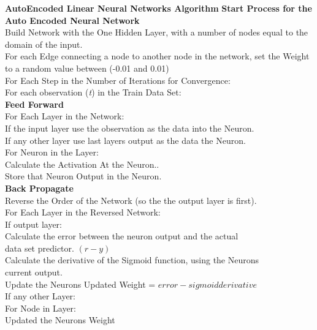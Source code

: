 \documentclass[twoside,11pt]{article}
\newcommand\tab[1][1cm]{\hspace*{#1}}
\begin{document}
\textbf{AutoEncoded Linear Neural Networks Algorithm}\newline
\textbf{Start Process for the Auto Encoded Neural Network}\\
Build Network with the One Hidden Layer, with a number of nodes equal to the domain of the input.\\
For each Edge connecting a node to another node in the network, set the Weight to a random value between (-0.01 and 0.01) \\
For Each Step in the Number of Iterations for Convergence:\\
\tab For each observation (\textit{t}) in the Train Data Set:\\
\tab \tab \textbf{Feed Forward}\\
\tab \tab \tab For Each Layer in the Network:\\
\tab \tab \tab \tab If the input layer use the observation as the data into the Neuron.\\
\tab \tab \tab \tab If any other layer use last layers output as the data the Neuron.\\
\tab \tab \tab \tab  For Neuron in the Layer:\\
\tab \tab \tab \tab \tab Calculate the Activation At the Neuron..\\
\tab \tab \tab \tab \tab Store that Neuron Output in the Neuron.\\
\tab \tab \textbf{Back Propagate} \\
\tab \tab \tab Reverse the Order of the Network (so the the output layer is first).\\
\tab \tab \tab For Each Layer in the Reversed Network:\\
\tab \tab \tab \tab If output layer:\\
\tab \tab \tab \tab \tab Calculate the error between the neuron output and the actual\\ 
\tab \tab \tab \tab \tab data set predictor. $(r-y)$\\
\tab \tab \tab \tab Calculate the derivative of the Sigmoid function, using the Neurons\\ 
\tab \tab \tab \tab current output.\\
\tab \tab \tab \tab Update the Neurons Updated Weight  = $error - sigmoid derivative$\\
\tab \tab \tab \tab If any other Layer:\\
\tab \tab \tab \tab \tab For Node in Layer:\\
\tab \tab \tab \tab \tab \tab Updated the Neurons Weight\\ 
\end{document}
